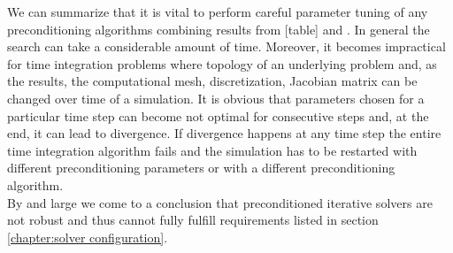 We can summarize that it is vital to perform careful parameter tuning of any preconditioning algorithms combining results from [table] and \cite{wsmp}. In general the  search can take a considerable amount of time. Moreover, it becomes impractical for time integration problems where topology of an underlying problem and, as the results, the computational mesh, discretization, Jacobian matrix can be changed over time of a simulation. It is obvious that parameters chosen for a particular time step can become not optimal for consecutive steps and, at the end, it can lead to divergence. If divergence happens at any time step the entire time integration algorithm fails and the simulation has to be restarted with different preconditioning parameters or with a different preconditioning algorithm.\\

By and large we come to a conclusion that preconditioned iterative solvers are not robust and thus cannot fully fulfill requirements listed in section \ref{chapter:solver configuration}.\\

